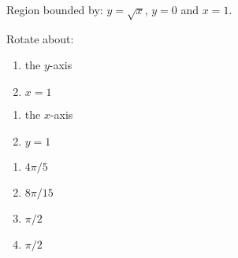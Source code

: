 {Region bounded by: $y=\sqrt{x}$, $y=0$ and $x=1$.

Rotate about:

\noindent%
\begin{minipage}[t]{.5\linewidth}
\begin{enumerate}
\item		the $y$-axis
\item		$x=1$
\end{enumerate}
\end{minipage}
\begin{minipage}[t]{.5\linewidth}
\begin{enumerate}\addtocounter{enumii}{2}
\item		the $x$-axis
\item		$y=1$
\end{enumerate}
\end{minipage}
}
{\begin{enumerate}
\item $4\pi/5$
\item $8\pi/15$
\item $\pi/2$
\item $\pi/2$
\end{enumerate}
}
